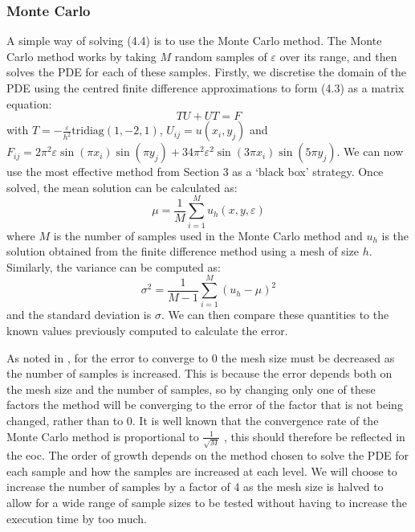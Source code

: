 \documentclass[11pt]{article}
\numberwithin{equation}{section}
\begin{document}
\subsubsection{Monte Carlo}
A simple way of solving (4.4) is to use the Monte Carlo method. The Monte Carlo method works by taking $M$ random samples of $\varepsilon$ over its range, and then solves the PDE for each of these samples. Firstly, we discretise the domain of the PDE using the centred finite difference approximations to form (4.3) as a matrix equation:
\begin{equation}
TU + UT = F
\end{equation}
with $T = -\frac{\varepsilon}{h^2} \text{tridiag}(1,-2,1)$, $U_{ij} = u(x_i, y_j)$ and $F_{ij} = 2\pi^2 \varepsilon \sin(\pi x_i) \sin(\pi y_j)+ 34 \pi^2 \varepsilon^2 \sin(3 \pi x_i) \sin(5 \pi y_j)$. We can now use the most effective method from Section 3 as a `black box' strategy. Once solved, the mean solution can be calculated as:
\begin{equation}
\mu = \frac{1}{M} \sum_{i=1}^M u_h (x, y, \varepsilon)
\end{equation}
where $M$ is the number of samples used in the Monte Carlo method and $u_h$ is the solution obtained from the finite difference method using a mesh of size $h$. Similarly, the variance can be computed as:
\begin{equation}
\sigma^2 = \frac{1}{M-1}\sum_{i=1}^M (u_h - \mu)^2
\end{equation}
and the standard deviation is $\sigma$. We can then compare these quantities to the known values previously computed to calculate the error.

As noted in \cite{Bishop}, for the error to converge to 0 the mesh size must be decreased as the number of samples is increased. This is because the error depends both on the mesh size and the number of samples, so by changing only one of these factors the method will be converging to the error of the factor that is not being changed, rather than to 0. It is well known that the convergence rate of the Monte Carlo method is proportional to $\frac{1}{\sqrt{M}}$ \cite{Kalos}, this should therefore be reflected in the eoc. The order of growth depends on the method chosen to solve the PDE for each sample and how the samples are increased at each level. We will choose to increase the number of samples by a factor of 4 as the mesh size is halved to allow for a wide range of sample sizes to be tested without having to increase the execution time by too much.
\end{document}
